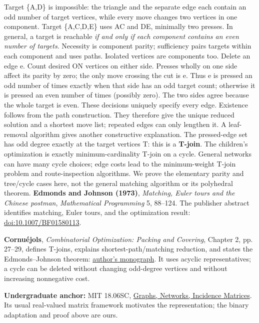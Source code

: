 \documentclass[12pt]{extarticle}
\begin{document}
\newpage
{}
Target \{A,D\} is impossible: the triangle and the separate edge each contain an odd number of target vertices, while every move changes two vertices in one component. Target \{A,C,D,E\} uses AC and DE, minimally two presses. In general, a target is reachable \emph{if and only if each component contains an even number of targets}. Necessity is component parity; sufficiency pairs targets within each component and uses paths. Isolated vertices are components too.
Delete an edge e. Count desired ON vertices on either side. Presses wholly on one side affect its parity by zero; the only move crossing the cut is e. Thus e is pressed an odd number of times exactly when that side has an odd target count; otherwise it is pressed an even number of times (possibly zero). The two sides agree because the whole target is even. These decisions uniquely specify every edge. Existence follows from the path construction. They therefore give the unique reduced solution and a shortest move list; repeated edges can only lengthen it. A leaf-removal algorithm gives another constructive explanation.
The pressed-edge set has odd degree exactly at the target vertices T: this is a \textbf{T-join}. The children's optimization is exactly minimum-cardinality T-join on a cycle. General networks can have many cycle choices; edge costs lead to the minimum-weight T-join problem and route-inspection algorithms. We prove the elementary parity and tree/cycle cases here, not the general matching algorithm or its polyhedral theorem.
\textbf{Edmonds and Johnson (1973)}, \emph{Matching, Euler tours and the Chinese postman}, \emph{Mathematical Programming} 5, 88--124. The publisher abstract identifies matching, Euler tours, and the optimization result: \href{https://doi.org/10.1007/BF01580113}{doi:10.1007/BF01580113}.\par
\textbf{Cornu\'ejols}, \emph{Combinatorial Optimization: Packing and Covering}, Chapter 2, pp. 27--29, defines T-joins, explains shortest-path/matching reduction, and states the Edmonds--Johnson theorem: \href{https://www.sfu.ca/~mdevos/notes/pack-cover/Cornuejols.pdf}{author's monograph}. It uses acyclic representatives; a cycle can be deleted without changing odd-degree vertices and without increasing nonnegative cost.\par
\textbf{Undergraduate anchor:} MIT 18.06SC, \href{https://ocw.mit.edu/courses/18-06sc-linear-algebra-fall-2011/pages/ax-b-and-the-four-subspaces/graphs-networks-incidence-matrices/}{Graphs, Networks, Incidence Matrices}. Its usual real-valued matrix framework motivates the representation; the binary adaptation and proof above are ours.
\end{document}

